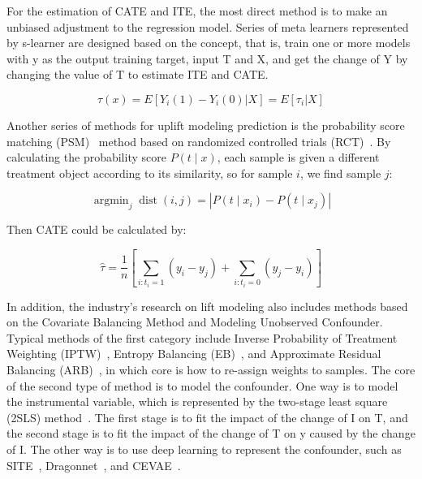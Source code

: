 \documentclass[sigconf,screen]{acmart}
\begin{document}
For the estimation of CATE and ITE, the most direct method is to make an unbiased adjustment to the regression model. Series of meta learners represented by s-learner are designed based on the concept, that is, train one or more models with y as the output training target, input T and X, and get the change of Y by changing the value of T to estimate ITE and CATE.

\begin{equation}
\tau(x) = E[Y_i(1) - Y_i(0)|X] = E[\tau_i|X]
\end{equation}

Another series of methods for uplift modeling prediction is the probability score matching (PSM)~\citep{PSM:Caliendo} method based on randomized controlled trials (RCT)~\citep{RCT}. By calculating the probability score $P(t \mid x)$, each sample is given a different treatment object according to its similarity, so for sample $i$, we find sample $j$:

\begin{equation}
    \operatorname{argmin}_{j} \operatorname{dist}(i, j)=\left|P\left(t \mid x_{i}\right)-P\left(t \mid x_{j}\right)\right|
\end{equation}

Then CATE could be calculated by:

\begin{equation}
    \hat{\tau}=\frac{1}{n}\left[\sum_{i: t_{i}=1}\left(y_{i}-y_{j}\right)+\sum_{i: t_{i}=0}\left(y_{j}-y_{i}\right)\right]
\end{equation}

In addition, the industry's research on lift modeling also includes methods based on the Covariate Balancing Method and Modeling Unobserved Confounder. Typical methods of the first category include Inverse Probability of Treatment Weighting (IPTW)~\citep{IPTW:Chesnaye}, Entropy Balancing (EB)~\citep{EB:Hainmueller}, and Approximate Residual Balancing (ARB)~\citep{ARB:Athey}, in which core is how to re-assign weights to samples. The core of the second type of method is to model the confounder. One way is to model the instrumental variable, which is represented by the two-stage least square (2SLS) method~\citep{2SLS:Bollen}. The first stage is to fit the impact of the change of I on T, and the second stage is to fit the impact of the change of T on y caused by the change of I. The other way is to use deep learning to represent the confounder, such as SITE~\citep{SITE:Yao}, Dragonnet~\citep{DragonNet:Tso}, and CEVAE~\citep{CEVAE:Louizos}.
\end{document}
